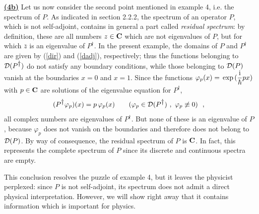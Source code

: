 \documentclass[a4wide,12pt]{report}
\begin{document}
\underline{{\bf (4b)}}
Let us now consider the second point mentioned in example 4, 
i.e. the spectrum of $P$.
As indicated in section 2.2.2, 
the spectrum of an 
operator $P$, which is not self-adjoint, 
contains in general
a part called {\em residual spectrum}:
by definition, these are all numbers $z \in {\bf C}$
which are not eigenvalues of $P$, but for which $\bar z$
is an eigenvalue of $P^{\dag}$.
In the present example, the domains of $P$ and $P^{\dag}$
are given by 
(\ref{dir}) and (\ref{dadj}), respectively;
thus the functions belonging to ${\cal D}(P^{\dag})$
do not satisfy any boundary conditions, while
those belonging to ${\cal D}(P)$ vanish at the boundaries
$x=0$ and $x=1$. 
Since the functions 
$\varphi_p (x)=  \, {\rm exp} \, ( \ds{\ri \over \hbar} px )$
 with $p \in \bc$ are solutions
of the eigenvalue equation for 
$P^{\dag}$,
\begin{equation}
\label{spr}
(P^{\dag} \varphi_p)(x) = p \,  \varphi_p(x)
\qquad ( \varphi_p \in {\cal D}(P^{\dag})
\ , \ \varphi_p \not \equiv 0 )
\ \ ,
\end{equation}
all complex numbers are eigenvalues of $P^{\dag}$.
But none of these is an eigenvalue of $P$, because 
$\varphi_p$ does not vanish on the boundaries and therefore
does not belong to ${\cal D}(P)$. 
By way of consequence, the residual spectrum of $P$ is $\bc$. 
In fact, this represents the 
 complete spectrum of $P$ since its  
discrete and continuous spectra
are empty. 

This conclusion resolves the puzzle of example 4, 
but it leaves the physicist perplexed: 
since $P$ is not 
 self-adjoint, its spectrum does not admit a direct 
 physical interpretation. However, we will show right away 
 that it contains information which is important for physics. 
\end{document}
